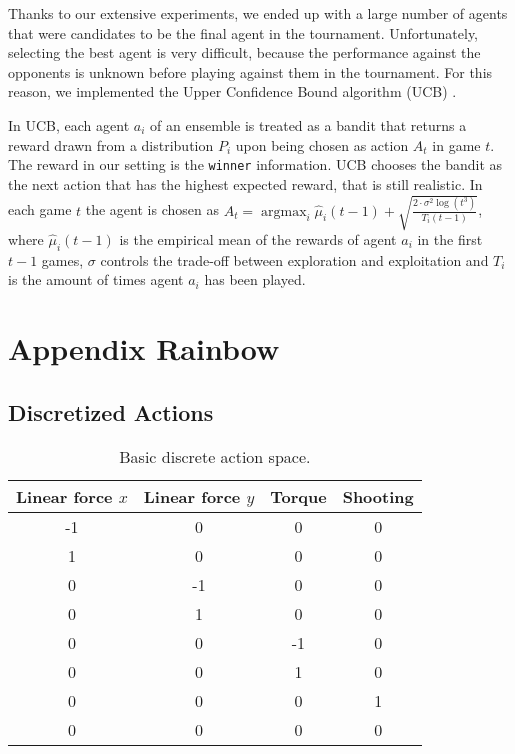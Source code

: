 \documentclass[11pt]{article}
\begin{document}
Thanks to our extensive experiments, we ended up with a large number of agents that were candidates to be the final agent in the tournament. Unfortunately, selecting the best agent is very difficult, because the performance against the opponents is unknown before playing against them in the tournament. For this reason, we implemented the Upper Confidence Bound algorithm (UCB) \cite{agrawal1995SampleMB}. 

In UCB, each agent $a_i$ of an ensemble is treated as a bandit that returns a reward drawn from a distribution $P_i$ upon being chosen as action $A_t$ in game $t$. The reward in our setting is the \texttt{winner} information. UCB chooses the bandit as the next action that has the highest expected reward, that is still realistic. In each game $t$ the agent is chosen as $A_t = \operatorname{argmax}_i \hat{\mu}_i(t-1) + \sqrt{\frac{2 \cdot \sigma^2 \log(t^3)}{T_i(t-1)}}$, where $\hat{\mu}_i(t-1)$ is the empirical mean of the rewards of agent $a_i$ in the first $t-1$ games, $\sigma$ controls the trade-off between exploration and exploitation and $T_i$ is the amount of times agent $a_i$ has been played. 



\section{Appendix Rainbow}\label{appendix:rainbow}

\subsection{Discretized Actions}

\begin{table}[H]
\centering
\caption{Basic discrete action space.}
\begin{tabular}{cccc}
\toprule
\textbf{Linear force $x$} & \textbf{Linear force $y$} & \textbf{Torque} & \textbf{Shooting} \\
\midrule
-1 & 0 & 0 & 0 \\
1 & 0 & 0 & 0 \\
0 & -1 & 0 & 0 \\
0 & 1 & 0 & 0 \\
0 & 0 & -1 & 0 \\
0 & 0 & 1 & 0 \\
0 & 0 & 0 & 1 \\
0 & 0 & 0 & 0 \\
\bottomrule
\end{tabular}
\end{table}
\end{document}

